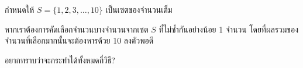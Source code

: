 \question{}

กำหนดให้ $S = \{\mathrm{1, 2, 3, \ldots, 10}\}$ เป็นเซตของจำนวนเต็ม

หากเราต้องการคัดเลือกจำนวนบางจำนวนจากเซต $S$ ที่ไม่ซ้ำกันอย่างน้อย 1 จำนวน 
โดยที่ผลรวมของจำนวนที่เลือกมากนั้นจะต้องหารด้วย 10 ลงตัวพอดี\hrsp%

อยากทราบว่าจะกระทำได้ทั้งหมดกี่วิธี?

